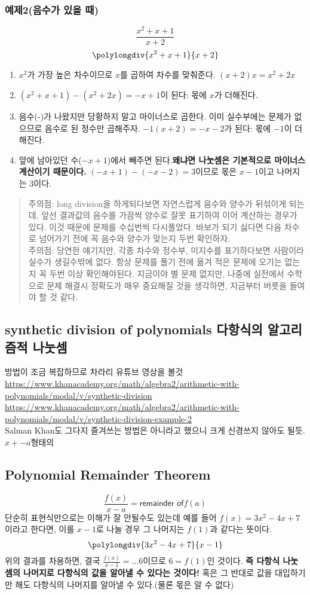 \documentclass{article}
\begin{document}
\subsubsection{예제2(음수가 있을 때)}
$$\frac{x^{2}+x+1}{x+2}$$
$$\polylongdiv{x^{2}+x+1}{x+2}$$
\begin{enumerate}
\item $x^{2}$가 가장 높은 차수이므로 $x$를 곱하여 차수를 맞춰준다. $(x+2)x=x^{2}+2x$
\item $(x^{2}+x+1)-(x^{2}+2x)=-x+1$이 된다: 몫에 $x$가 더해진다.
\item 음수(-)가 나왔지만 당황하지 말고 마이너스로 곱한다. 이미 실수부에는 문제가 없으므로 음수로 된 정수만 곱해주자. $-1(x+2)=-x-2$가 된다: 몫에 $-1$이 더해진다.
\item 앞에 남아있던 수($-x+1$)에서 빼주면 된다.\textbf{왜냐면 나눗셈은 기본적으로 마이너스 계산이기 때문이다.} $(-x+1)-(-x-2)=3$이므로 몫은 $x-1$이고 나머지는 $3$이다.
\end{enumerate}
\begin{quote}
{\color{red} 주의점}: long division을 하게되다보면 자연스럽게 음수와 양수가 뒤섞이게 되는데, 앞선 결과값의 음수를 가끔씩 양수로 잘못 표기하여 이어 계산하는 경우가 있다. 이것 때문에 문제를 수십번씩 다시풀었다. 바보가 되기 싫다면 다음 차수로 넘어가기 전에 꼭 음수와 양수가 맞는지 두번 확인하자.\\
{\color{red} 주의점}: 당연한 얘기지만, 각종 차수와 정수부, 미지수를 표기하다보면 사람이라 실수가 생길수밖에 없다. 항상 문제를 풀기 전에 옮겨 적은 문제에 오기는 없는지 꼭 두번 이상 확인해야된다. 지금이야 별 문제 없지만, 나중에 실전에서 수학으로 문제 해결시 정확도가 매우 중요해질 것을 생각하면, 지금부터 버릇을 들여야 할 것 같다.
\end{quote}

\subsection {synthetic division of polynomials 다항식의 알고리즘적 나눗셈}
방법이 조금 복잡하므로 차라리 유튜브 영상을 볼것
\vspace{12pt}\\
\url{https://www.khanacademy.org/math/algebra2/arithmetic-with-polynomials/modal/v/synthetic-division}
\vspace{12pt}\\
\url{https://www.khanacademy.org/math/algebra2/arithmetic-with-polynomials/modal/v/synthetic-division-example-2}\\
Salman Khan도 그다지 즐겨쓰는 방법은 아니라고 했으니 크게 신경쓰지 않아도 될듯. $x+-a$형태의 

\subsection{Polynomial Remainder Theorem}
$$\frac{f(x)}{x-a}={\textsf{remainder of}} f(a)$$
단순히 표현식만으로는 이해가 잘 안될수도 있는데 예를 들어 $f(x) = 3x^{2}-4x+7$이라고 한다면, 이를 $x-1$로 나눌 경우 그 나머지는 $f(1)$과 같다는 뜻이다.
$$\polylongdiv{3x^{2}-4x+7}{x-1}$$
위의 결과를 차용하면, 결국 $\frac{f(x)}{x-1}=...6$이므로 $6=f(1)$인 것이다. \textbf{즉 다항식 나눗셈의 나머지로 다항식의 값을 알아낼 수 있다는 것이다!} 혹은 그 반대로 값을 대입하기만 해도 다항식의 나머지를 알아낼 수 있다.(물론 몫은 알 수 없다)
\end{document}
